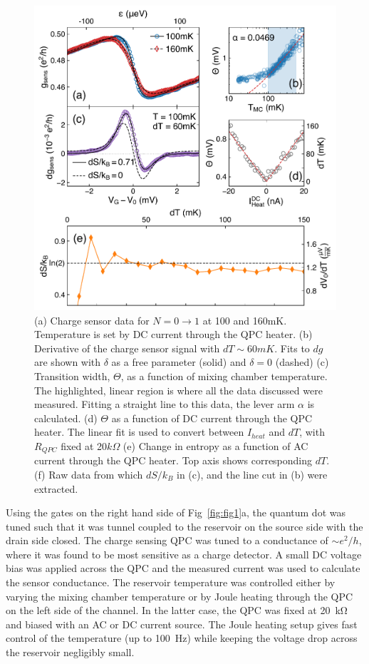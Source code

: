\documentclass[twocolumn,showpacs,preprintnumbers,amsmath,amssymb,pra,aps,superscriptaddress]{revtex4-1}
\begin{document}

\begin{figure}[!]
        \includegraphics[width=1.0\columnwidth]{../figures/figure_2.pdf}
        \caption{\label{fig:fig2}(a) Charge sensor data for $N=0 \rightarrow 1$ at 100 and 160mK. Temperature is set by DC current through the QPC heater. (b) Derivative of the charge sensor signal with $dT \sim 60mK$. Fits to $dg$ are shown with $\delta$ as a free parameter (solid) and $\delta=0$ (dashed) (c) Transition width, $\Theta$, as a function of mixing chamber temperature. The highlighted, linear region is where all the data discussed were measured. Fitting a straight line to this data, the lever arm $\alpha$ is calculated. (d) $\Theta$ as a function of DC current through the QPC heater. The linear fit is used to convert between $I_{heat}$ and $dT$, with $R_{QPC}$ fixed at 20$k\Omega$ (e) Change in entropy as a function of AC current through the QPC heater. Top axis shows corresponding $dT$. (f) Raw data from which $dS / k_B$ in (c), and the line cut in (b) were extracted.}
\end{figure}

Using the gates on the right hand side of Fig~\ref{fig:fig1}a, the quantum dot was tuned such that it was tunnel coupled to the reservoir on the source side with the drain side closed. The charge sensing QPC was tuned to a conductance of ${\sim}e^2/h$, where it was found to be most sensitive as a charge detector. A small DC voltage bias was applied across the QPC and the measured current was used to calculate the sensor conductance. The reservoir temperature was controlled either by varying the mixing chamber temperature or by Joule heating through the QPC on the left side of the channel. In the latter case, the QPC was fixed at \SI{20}{\kilo\ohm} and biased with an AC or DC current source. The Joule heating setup gives fast control of the temperature (up to \SI{100}{\hertz}) while keeping the voltage drop across the reservoir negligibly small.
\end{document}
